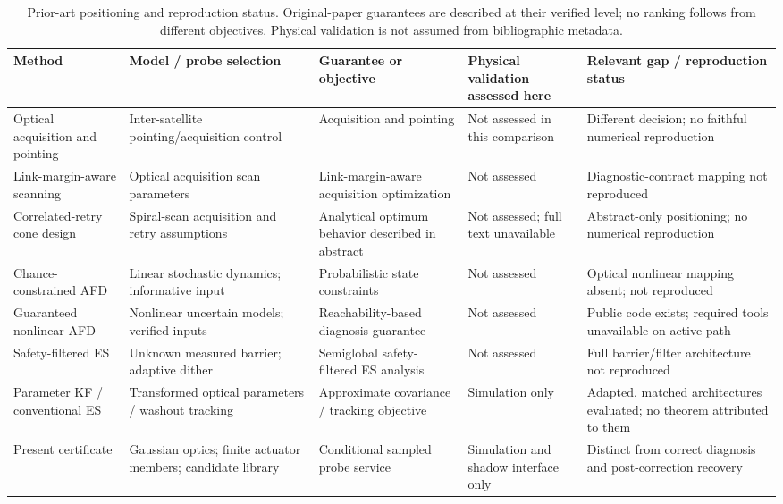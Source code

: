 \begin{table}[t]
\caption{Prior-art positioning and reproduction status. Original-paper guarantees are described at their verified level; no ranking follows from different objectives. Physical validation is not assumed from bibliographic metadata.}
\centering\footnotesize\setlength{\tabcolsep}{4pt}
\begin{tabular}{@{}p{}p{}p{}p{}p{}@{}}\toprule
Method & Model / probe selection & Guarantee or objective & Physical validation assessed here & Relevant gap / reproduction status\\\midrule
Optical acquisition and pointing \cite{guelman} & Inter-satellite pointing/acquisition control & Acquisition and pointing & Not assessed in this comparison & Different decision; no faithful numerical reproduction\\
Link-margin-aware scanning \cite{yan} & Optical acquisition scan parameters & Link-margin-aware acquisition optimization & Not assessed & Diagnostic-contract mapping not reproduced\\
Correlated-retry cone design \cite{oh} & Spiral-scan acquisition and retry assumptions & Analytical optimum behavior described in abstract & Not assessed; full text unavailable & Abstract-only positioning; no numerical reproduction\\
Chance-constrained AFD \cite{guo} & Linear stochastic dynamics; informative input & Probabilistic state constraints & Not assessed & Optical nonlinear mapping absent; not reproduced\\
Guaranteed nonlinear AFD \cite{massa} & Nonlinear uncertain models; verified inputs & Reachability-based diagnosis guarantee & Not assessed & Public code exists; required tools unavailable on active path\\
Safety-filtered ES \cite{safees} & Unknown measured barrier; adaptive dither & Semiglobal safety-filtered ES analysis & Not assessed & Full barrier/filter architecture not reproduced\\
Parameter KF / conventional ES & Transformed optical parameters / washout tracking & Approximate covariance / tracking objective & Simulation only & Adapted, matched architectures evaluated; no theorem attributed to them\\
Present certificate & Gaussian optics; finite actuator members; candidate library & Conditional sampled probe service & Simulation and shadow interface only & Distinct from correct diagnosis and post-correction recovery\\\bottomrule
\end{tabular}
\label{tab:prior}
\end{table}
